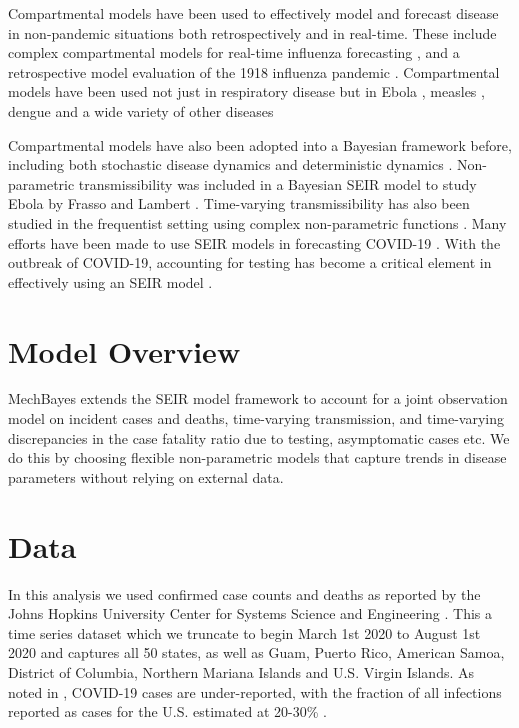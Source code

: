 \documentclass[11pt]{amsart}
\begin{document}
Compartmental models have been used to effectively model and forecast disease in non-pandemic situations both retrospectively and in real-time. These include complex compartmental models for real-time influenza forecasting \cite{shaman2012forecasting, osthus2017forecasting,ong2010real}, and a retrospective model evaluation of the 1918 influenza pandemic \cite{hall2007real}. Compartmental models have been used not just in respiratory disease but in Ebola \cite{lekone2006statistical}, measles \cite{bokler1993chaos}, dengue \cite{syafruddin2012seir} and a wide variety of other diseases

Compartmental models have also been adopted into a Bayesian framework before, including both stochastic disease dynamics and deterministic dynamics \cite{hotta2010bayesian,dukic2012tracking}. Non-parametric transmissibility was included in a Bayesian SEIR model to study Ebola by Frasso and Lambert \cite{frasso2016bayesian}. Time-varying transmissibility has also been studied in the frequentist setting using complex non-parametric functions \cite{smirnova2019forecasting}. Many efforts have been made to use SEIR models in forecasting COVID-19 \cite{giordano2020modelling,yang2020modified,bertozzi2020challenges}\cite{prem2020effect,flaxman2020estimating}. With the outbreak of COVID-19, accounting for testing has become a critical element in effectively using an SEIR model  \cite{lopez2020modified,pei2020differential}. 



\section{Model Overview}

MechBayes extends the SEIR model framework to account for a joint observation model on incident cases and deaths, time-varying transmission, and time-varying discrepancies in the case fatality ratio due to testing, asymptomatic cases etc. We do this by choosing flexible non-parametric models that capture trends in disease parameters without relying on external data. 

\section{Data}
	In this analysis we used confirmed case counts and deaths as reported by the Johns Hopkins University Center for Systems Science and Engineering \cite{dong2020interactive}. This a time series dataset which we truncate to begin March 1st 2020 to August 1st 2020 and captures all 50 states, as well as Guam, Puerto Rico, American Samoa, District of Columbia, Northern Mariana Islands and U.S. Virgin Islands. As noted in \cite{krantz2020level}, COVID-19 cases are under-reported, with the fraction of all infections reported as cases for the U.S. estimated at 20-30\% \cite{russel2020using}. 
	
\end{document}
